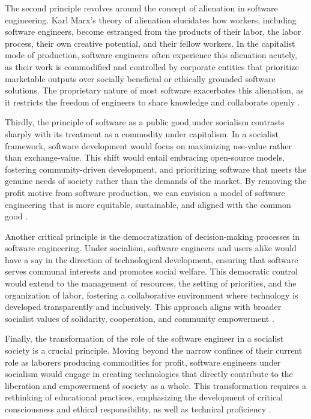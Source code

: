 \begin{refsection}
The second principle revolves around the concept of alienation in software engineering. Karl Marx’s theory of alienation elucidates how workers, including software engineers, become estranged from the products of their labor, the labor process, their own creative potential, and their fellow workers. In the capitalist mode of production, software engineers often experience this alienation acutely, as their work is commodified and controlled by corporate entities that prioritize marketable outputs over socially beneficial or ethically grounded software solutions. The proprietary nature of most software exacerbates this alienation, as it restricts the freedom of engineers to share knowledge and collaborate openly \cite[pp.~75-80]{marx1844Manuscripts2018}.

Thirdly, the principle of software as a public good under socialism contrasts sharply with its treatment as a commodity under capitalism. In a socialist framework, software development would focus on maximizing use-value rather than exchange-value. This shift would entail embracing open-source models, fostering community-driven development, and prioritizing software that meets the genuine needs of society rather than the demands of the market. By removing the profit motive from software production, we can envision a model of software engineering that is more equitable, sustainable, and aligned with the common good \cite[pp.~210-215]{stallmanFreeSoftware2010}.

Another critical principle is the democratization of decision-making processes in software engineering. Under socialism, software engineers and users alike would have a say in the direction of technological development, ensuring that software serves communal interests and promotes social welfare. This democratic control would extend to the management of resources, the setting of priorities, and the organization of labor, fostering a collaborative environment where technology is developed transparently and inclusively. This approach aligns with broader socialist values of solidarity, cooperation, and community empowerment \cite[pp.~220-225]{freirePedagogy2021}.

Finally, the transformation of the role of the software engineer in a socialist society is a crucial principle. Moving beyond the narrow confines of their current role as laborers producing commodities for profit, software engineers under socialism would engage in creating technologies that directly contribute to the liberation and empowerment of society as a whole. This transformation requires a rethinking of educational practices, emphasizing the development of critical consciousness and ethical responsibility, as well as technical proficiency \cite[pp.~130-135]{harawayCyborgManifesto2016}.


\end{refsection}
